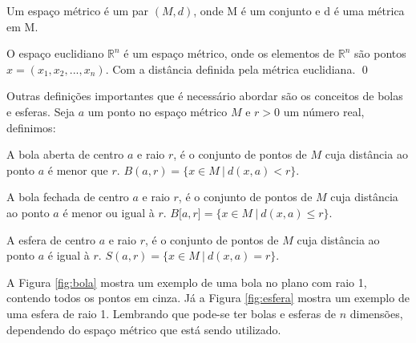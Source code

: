     \begin{definition}
        Um espaço métrico é um par $(M,d)$, onde M é um conjunto e d é uma métrica em M.
    \end{definition}

    \begin{exemplo}
        O espaço euclidiano $\mathbb{R}^n$ é um espaço métrico, onde os elementos de $\mathbb{R}^n$ são pontos $x = (x_1,x_2,...,x_n)$. Com a distância definida pela métrica euclidiana.
    \qed
    \end{exemplo}

    Outras definições importantes que é necessário abordar são os conceitos de bolas e esferas. Seja $a$ um ponto no espaço métrico $M$ e $r > 0$ um número real, definimos:

    \begin{definition}
         A bola aberta de centro $a$ e raio $r$, é o conjunto de pontos de $M$ cuja distância ao ponto $a$ é menor que $r$. $B(a,r) = \{x \in M\ |\ d(x,a) < r\}$.
    \end{definition}

    \begin{definition}
        A bola fechada de centro $a$ e raio $r$, é o conjunto de pontos de $M$ cuja distância ao ponto $a$ é menor ou igual à $r$. $B{[}a,r{]} = \{x \in M\ |\ d(x,a) \leq r\}$.
    \end{definition}

    \begin{definition}[esfera]
        A esfera de centro $a$ e raio $r$, é o conjunto de pontos de $M$ cuja distância ao ponto $a$ é igual à $r$. $S(a,r) = \{x \in M\ |\ d(x,a) = r\}$.
    \end{definition}

    A Figura \ref{fig:bola} mostra um exemplo de uma bola no plano com raio 1, contendo todos os pontos em cinza. Já a Figura \ref{fig:esfera} mostra um exemplo de uma esfera de raio 1. Lembrando que pode-se ter bolas e esferas de $n$ dimensões, dependendo do espaço métrico que está sendo utilizado.

